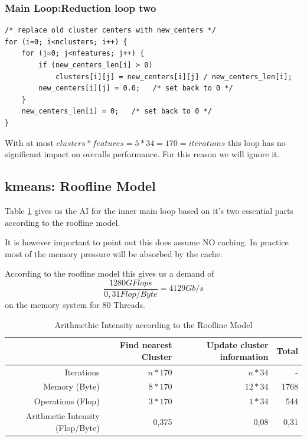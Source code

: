 \documentclass[]{article}
\begin{document}
\subsubsection{Main Loop:Reduction loop two}
\begin{lstlisting}[caption={Reduction pt2}]
/* replace old cluster centers with new_centers */
for (i=0; i<nclusters; i++) {
	for (j=0; j<nfeatures; j++) {
		if (new_centers_len[i] > 0)
			clusters[i][j] = new_centers[i][j] / new_centers_len[i];
		new_centers[i][j] = 0.0;   /* set back to 0 */
	}
	new_centers_len[i] = 0;   /* set back to 0 */
}
\end{lstlisting}
With at most $clusters * features = 5 * 34 = 170 = iterations$ this loop has no significant impact on overalls performance.
For this reason we will ignore it.

\subsection{kmeans: Roofline Model}

Table \ref{tab:AI} gives us the AI for the inner main loop based on it's two essential parts according to the roofline model.

It is however important to point out this does assume NO caching. In practice most of the memory pressure will be absorbed by the cache.

According to the roofline model this gives us a demand of $$\frac{1280GFlops}{0,31Flop/Byte} = 4129 Gb/s$$ on the memory system for 80 Threads.

\begin{table}[ht]
	\centering
	\caption{Arithmethic Intensity according to the Roofline Model}
	\label{tab:AI}
	\begin{tabular}{|r|r|r|r|}
		\hline
		& Find nearest Cluster & Update cluster information & Total \\ \hline
		Iterations           & $n * 170$            & $n*34$                     & -     \\ \hline
		Memory (Byte)              & $8*170$              & $12*34$                      & 1768  \\ \hline
		Operations (Flop)          & $3*170$              & $1*34$                       & 544   \\ \hline
		Arithmetic Intensity (Flop/Byte) & 0,375                & 0,08                       & 0,31  \\ \hline
	\end{tabular}
\end{table}
\end{document}
